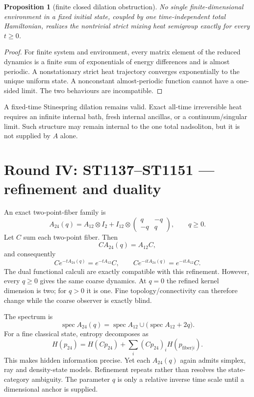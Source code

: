 \documentclass[11pt,a4paper]{article}
\newtheorem{proposition}[theorem]{Proposition}
\begin{document}
\begin{proposition}[finite closed dilation obstruction]
No single finite-dimensional environment in a fixed initial state, coupled by
one time-independent total Hamiltonian, realizes the nontrivial strict mixing
heat semigroup exactly for every $t\ge0$.
\end{proposition}

\begin{proof}
For finite system and environment, every matrix element of the reduced
dynamics is a finite sum of exponentials of energy differences and is almost
periodic.  A nonstationary strict heat trajectory converges exponentially to
the unique uniform state.  A nonconstant almost-periodic function cannot have
a one-sided limit.  The two behaviours are incompatible.
\end{proof}

A fixed-time Stinespring dilation remains valid.  Exact all-time irreversible
heat requires an infinite internal bath, fresh internal ancillas, or a
continuum/singular limit.  Such structure may remain internal to the one total
nadsoliton, but it is not supplied by $A$ alone.

\section{Round IV: ST1137--ST1151 --- refinement and duality}

An exact two-point-fiber family is
\[
 A_{24}(q)=A_{12}\otimes I_2+I_{12}\otimes
 \begin{pmatrix}q&-q\\-q&q\end{pmatrix},
 \qquad q\ge0.
\]
Let $C$ sum each two-point fiber.  Then
\[
 CA_{24}(q)=A_{12}C,
\]
and consequently
\[
 Ce^{-tA_{24}(q)}=e^{-tA_{12}}C,
 \qquad
 Ce^{-itA_{24}(q)}=e^{-itA_{12}}C.
\]
The dual functional calculi are exactly compatible with this refinement.
However, every $q\ge0$ gives the same coarse dynamics.  At $q=0$ the refined
kernel dimension is two; for $q>0$ it is one.  Fine topology/connectivity can
therefore change while the coarse observer is exactly blind.

The spectrum is
\[
 \operatorname{spec}A_{24}(q)
 =\operatorname{spec}A_{12}
 \cup\bigl(\operatorname{spec}A_{12}+2q\bigr).
\]
For a fine classical state, entropy decomposes as
\[
 H(p_{24})=H(Cp_{24})+
 \sum_i(Cp_{24})_iH(p_{\mathrm{fiber}|i}).
\]
This makes hidden information precise.  Yet each $A_{24}(q)$ again admits
simplex, ray and density-state models.  Refinement repeats rather than resolves
the state-category ambiguity.  The parameter $q$ is only a relative inverse
time scale until a dimensional anchor is supplied.
\end{document}
